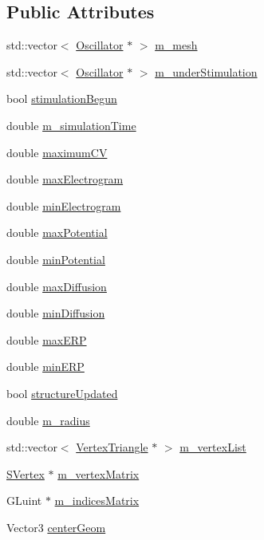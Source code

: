 \subsection*{Public Attributes}
\begin{DoxyCompactItemize}
\item 
std\+::vector$<$ \hyperlink{class_oscillator}{Oscillator} $\ast$ $>$ \hyperlink{class_cardiac_mesh_acd49de8f8f878f45c927d4b75851ced6}{m\+\_\+mesh}
\item 
std\+::vector$<$ \hyperlink{class_oscillator}{Oscillator} $\ast$ $>$ \hyperlink{class_cardiac_mesh_a21749f0b4af8fe59552f97058982f695}{m\+\_\+under\+Stimulation}
\item 
bool \hyperlink{class_cardiac_mesh_ac14b1f228c8426e067df4a925824348e}{stimulation\+Begun}
\item 
double \hyperlink{class_cardiac_mesh_ad1bf6fc56cbc55f30f9a3855cdafc316}{m\+\_\+simulation\+Time}
\item 
double \hyperlink{class_cardiac_mesh_a368d38e1e90d407ffff649c9b7a3e188}{maximum\+C\+V}
\item 
double \hyperlink{class_cardiac_mesh_a086be28c59e4edcebade42b3bdf51f01}{max\+Electrogram}
\item 
double \hyperlink{class_cardiac_mesh_a6b6807ee55b0b31ff4b9c34bd94eace1}{min\+Electrogram}
\item 
double \hyperlink{class_cardiac_mesh_afda78e5c2917e42ba401dc1be7f84f1f}{max\+Potential}
\item 
double \hyperlink{class_cardiac_mesh_af4837ac47dd1c8f12b400a0ca7c1c94f}{min\+Potential}
\item 
double \hyperlink{class_cardiac_mesh_a12c5bfc555eca8ecff53e9a5977d8be4}{max\+Diffusion}
\item 
double \hyperlink{class_cardiac_mesh_a5f461b34861dc6f7a343bcdbd79a35d3}{min\+Diffusion}
\item 
double \hyperlink{class_cardiac_mesh_a6a0691957ee41597ea241be5bb740bf2}{max\+E\+R\+P}
\item 
double \hyperlink{class_cardiac_mesh_a4aae36cc4fd814771864c32d52d24480}{min\+E\+R\+P}
\item 
bool \hyperlink{class_cardiac_mesh_aa23210cc3b7de35c82ebbcde43e053c2}{structure\+Updated}
\item 
double \hyperlink{class_cardiac_mesh_a4ebcb3d40ec7fbfea0b8f230a1677a00}{m\+\_\+radius}
\item 
std\+::vector$<$ \hyperlink{struct_vertex_triangle}{Vertex\+Triangle} $\ast$ $>$ \hyperlink{class_cardiac_mesh_a1961c25aa2da5493c0316d80c38cc088}{m\+\_\+vertex\+List}
\item 
\hyperlink{struct_s_vertex}{S\+Vertex} $\ast$ \hyperlink{class_cardiac_mesh_a0d622a665e0305897c133c8c4fe8733a}{m\+\_\+vertex\+Matrix}
\item 
G\+Luint $\ast$ \hyperlink{class_cardiac_mesh_a38f8cd7d06495c84b553eba41c9cb6be}{m\+\_\+indices\+Matrix}
\item 
Vector3 \hyperlink{class_cardiac_mesh_a671a783c6a63a79cc29e0b0baf8eda08}{center\+Geom}
\end{DoxyCompactItemize}


